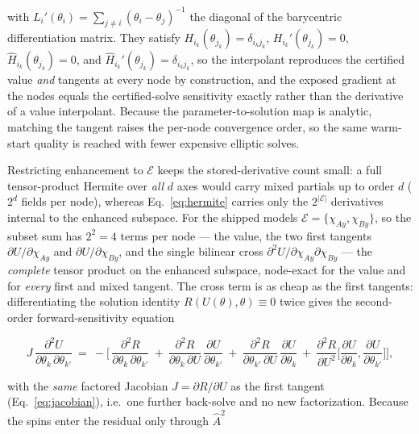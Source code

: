 \documentclass[
  aps,
  prd,
  twocolumn,
  amsmath,
  amssymb,
  nofootinbib,
  superscriptaddress,
  floatfix,
]{revtex4-2}
\newcommand{\Ahat}{\hat{A}}
\begin{document}
with $L_i'(\theta_i)=\sum_{j\neq i}(\theta_i-\theta_j)^{-1}$ the diagonal of the
barycentric differentiation matrix. They satisfy
$H_{i_k}(\theta_{j_k})=\delta_{i_k j_k}$, $H_{i_k}'(\theta_{j_k})=0$,
$\hat H_{i_k}(\theta_{j_k})=0$, and $\hat H_{i_k}'(\theta_{j_k})=\delta_{i_k j_k}$, so
the interpolant reproduces the certified value \emph{and} tangents at every node by
construction, and the exposed gradient at the nodes equals the certified-solve
sensitivity exactly rather than the derivative of a value interpolant. Because the
parameter-to-solution map is analytic, matching the tangent raises the per-node
convergence order, so the same warm-start quality is reached with fewer expensive
elliptic solves.

Restricting enhancement to $\mathcal{E}$ keeps the stored-derivative count small: a
full tensor-product Hermite over \emph{all} $d$ axes would carry mixed partials up to
order $d$ ($2^d$ fields per node), whereas Eq.~\eqref{eq:hermite} carries only the
$2^{|\mathcal{E}|}$ derivatives internal to the enhanced subspace. For the shipped
models $\mathcal{E}=\{\chi_{Ay},\chi_{By}\}$, so the subset sum has
$2^2=4$ terms per node --- the value, the two first tangents $\partial U/\partial\chi_{Ay}$
and $\partial U/\partial\chi_{By}$, and the single bilinear cross
$\partial^2 U/\partial\chi_{Ay}\partial\chi_{By}$ --- the \emph{complete}
tensor product on the enhanced subspace, node-exact for the value and for
\emph{every} first and mixed tangent. The cross term is as cheap as the first
tangents: differentiating the solution identity $R(U(\theta),\theta)\equiv0$ twice
gives the second-order forward-sensitivity equation
\begin{widetext}
\begin{equation}
  J\,\frac{\partial^2 U}{\partial\theta_k\,\partial\theta_{k'}} \ = \ -\bigg[\,
    \frac{\partial^2 R}{\partial\theta_k\,\partial\theta_{k'}}
    \ + \ \frac{\partial^2 R}{\partial\theta_k\,\partial U}\,\frac{\partial U}{\partial\theta_{k'}}
    \ + \ \frac{\partial^2 R}{\partial\theta_{k'}\,\partial U}\,\frac{\partial U}{\partial\theta_{k}}
    \ + \ \frac{\partial^2 R}{\partial U^2}\Big[\frac{\partial U}{\partial\theta_k},\frac{\partial U}{\partial\theta_{k'}}\Big]
  \bigg],
  \label{eq:cross_tangent}
\end{equation}
\end{widetext}
with the \emph{same} factored Jacobian $J=\partial R/\partial U$ as the first tangent
(Eq.~\ref{eq:jacobian}), i.e.\ one further back-solve and no new factorization.
Because the spins enter the residual only through $\Ahat^2$
\end{document}
